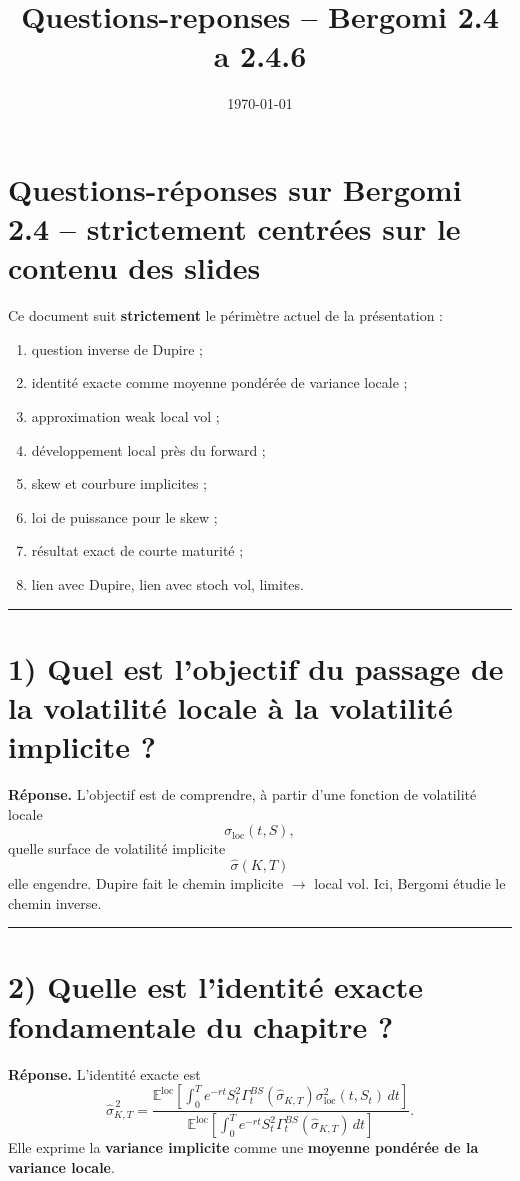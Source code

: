 \documentclass[11pt,a4paper]{article}
\title{Questions-reponses -- Bergomi 2.4 a 2.4.6}
\author{}
\date{\today}
\begin{document}
\maketitle
\tableofcontents
\newpage
\section{Questions-réponses sur Bergomi 2.4 -- strictement centrées sur le contenu des slides}

Ce document suit \textbf{strictement} le périmètre actuel de la présentation :

\begin{enumerate}
\item question inverse de Dupire ;
\item identité exacte comme moyenne pondérée de variance locale ;
\item approximation weak local vol ;
\item développement local près du forward ;
\item skew et courbure implicites ;
\item loi de puissance pour le skew ;
\item résultat exact de courte maturité ;
\item lien avec Dupire, lien avec stoch vol, limites.
\end{enumerate}

\bigskip\hrule\bigskip

\section{1) Quel est l’objectif du passage de la volatilité locale à la volatilité implicite ?}

\textbf{Réponse.}  
L’objectif est de comprendre, à partir d’une fonction de volatilité locale
\[
\sigma_{\mathrm{loc}}(t,S),
\]
quelle surface de volatilité implicite
\[
\hat\sigma(K,T)
\]
elle engendre.  
Dupire fait le chemin implicite \(\to\) local vol. Ici, Bergomi étudie le chemin inverse.

\bigskip\hrule\bigskip

\section{2) Quelle est l’identité exacte fondamentale du chapitre ?}

\textbf{Réponse.}  
L’identité exacte est
\[
\hat\sigma_{K,T}^{\,2}
=
\frac{
\mathbb E^{\mathrm{loc}}
\!\left[
\int_0^T e^{-rt}S_t^2\Gamma_t^{BS}(\hat\sigma_{K,T})
\sigma_{\mathrm{loc}}^2(t,S_t)\,dt
\right]
}{
\mathbb E^{\mathrm{loc}}
\!\left[
\int_0^T e^{-rt}S_t^2\Gamma_t^{BS}(\hat\sigma_{K,T})\,dt
\right]
}.
\]
Elle exprime la \textbf{variance implicite} comme une \textbf{moyenne pondérée de la variance locale}.
\end{document}

